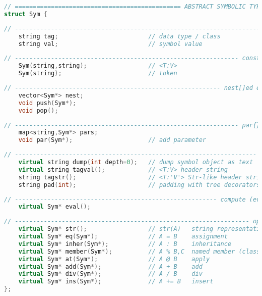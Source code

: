 
\begin{lstlisting}[language=C++]
// ============================================== ABSTRACT SYMBOLIC TYPE (AST)
struct Sym {
\end{lstlisting}

\begin{lstlisting}[language=C++,title=тип (класс) и значение элемента данных]
// ---------------------------------------------------------------------------
	string tag;							// data type / class
	string val;							// symbol value
\end{lstlisting}

\begin{lstlisting}[language=C++,title=конструкторы (токен используется в
лексере)]
// -------------------------------------------------------------- constructors
	Sym(string,string);					// <T:V>
	Sym(string);						// token
\end{lstlisting}

\begin{lstlisting}[language=C++,
title=AST может хранить (и обрабатывать) вложенные элементы]
// --------------------------------------------------------- nest[]ed elements
	vector<Sym*> nest;
	void push(Sym*);
	void pop();
\end{lstlisting}

\begin{lstlisting}[language=C++,title=параметры (и поля класса)]
// -------------------------------------------------------------- par{}ameters
	map<string,Sym*> pars;
	void par(Sym*);						// add parameter
\end{lstlisting}

\begin{lstlisting}[language=C++,title=вывод дампа объекта в текстовом формате]
// ------------------------------------------------------------------- dumping
	virtual string dump(int depth=0);	// dump symbol object as text
	virtual string tagval();			// <T:V> header string
	string tagstr();					// <T:'V'> Str-like header string
	string pad(int);					// padding with tree decorators
\end{lstlisting}

\begin{lstlisting}[language=C++,title=вычисление объекта]
// -------------------------------------------------------- compute (evaluate)
	virtual Sym* eval();
\end{lstlisting}

\begin{lstlisting}[language=C++,title=операторы]
// ----------------------------------------------------------------- operators
	virtual Sym* str();					// str(A)	string representation
	virtual Sym* eq(Sym*);				// A = B	assignment
	virtual Sym* inher(Sym*);			// A : B	inheritance
	virtual Sym* member(Sym*);			// A % B,C	named member (class slot)
	virtual Sym* at(Sym*);				// A @ B	apply
	virtual Sym* add(Sym*);				// A + B	add
	virtual Sym* div(Sym*);				// A / B	div
	virtual Sym* ins(Sym*);				// A += B	insert
};
\end{lstlisting}
